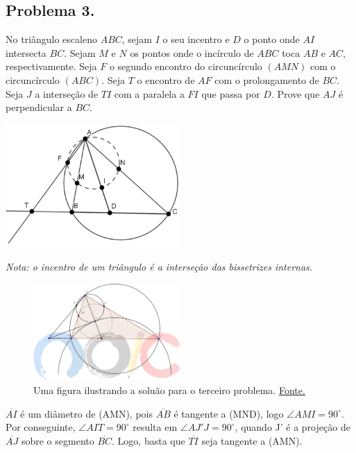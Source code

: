 \documentclass[12pt]{article}
\begin{document}
    \subsection{Problema 3.}
      \begin{tcolorbox}[problembox={Enunciado do problema}]
        No triângulo escaleno $ABC$, sejam $I$ o seu incentro e $D$ o ponto onde $AI$
        intersecta $BC$. Sejam $M$ e $N$ os pontos onde o incírculo de $ABC$ toca $AB$
        e $AC$, respectivamente. Seja $F$ o segundo encontro do circuncírculo $(AMN)$
        com o circuncírculo $(ABC)$. Seja $T$ o encontro de $AF$ com o prolongamento
        de $BC$. Seja $J$ a interseção de $TI$ com a paralela a $FI$ que passa por $D$.
        Prove que $AJ$ é perpendicular a $BC$.

        \centering
          \includegraphics[width=0.5\textwidth]{third.png}

        \textit{Nota: o incentro de um triângulo é a interseção das bissetrizes internas.}
      \end{tcolorbox}

      \begin{figure}[h]
        \centering
        \includegraphics[width=0.5\textwidth]{fourth.png}
        \caption{Uma figura ilustrando a soluão para o terceiro problema. \href{https://noic.com.br/wp-content/uploads/2025/03/Solucoes_do_TM2_2024_Nivel_A.pdf}{Fonte.}}
      \end{figure}

      $\overline{AI}$ é um diâmetro de (AMN), pois $\overline{AB}$ é tangente a (MND), logo
      $\angle{AMI} = 90^{\circ}$. Por conseguinte, $\angle{AIT} = 90^{\circ}$ resulta em
      $\angle AJ'J = 90^{\circ}$, quando J' é a projeção de $\overline{AJ}$ sobre o segmento 
      $\overline{BC}$. Logo, basta que $\overline{TI}$ seja tangente a (AMN).
\end{document}
